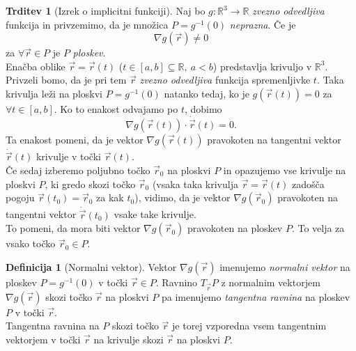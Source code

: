\documentclass[11pt]{article}
\theoremstyle{definition}
\newtheorem{definicija}{Definicija}[section]
\theoremstyle{definition}
\newtheorem{trditev}{Trditev}[section]
\theoremstyle{definition}
\begin{document}
\begin{trditev}[Izrek o implicitni funkciji]

Naj bo $g: \mathbb{R}^3 \rightarrow \mathbb{R}$ \textit{zvezno odvedljiva} funkcija in privzemimo, da je množica $P = g^{-1}(0)$ \textit{neprazna}. Če je
$$\nabla g(\vec{r}) \neq 0$$
za $\forall \vec{r} \in P$ je $P$ \textit{ploskev}. \\

Enačba oblike $\vec{r} = \vec{r}(t)$ ($t \in [a, b] \subseteq \mathbb{R}, ~a < b$) predstavlja krivuljo v $\mathbb{R}^3$. Privzeli bomo, da je pri tem $\vec{r}$ \textit{zvezno odvedljiva} funkcija spremenljivke $t$. Taka krivulja leži na ploskvi $P = g^{-1}(0)$ natanko tedaj, ko je $g(\vec{r}(t)) = 0$ za $\forall t \in [a, b]$. Ko to enakost odvajamo po $t$, dobimo
$$\nabla g(\vec{r}(t)) \cdot \dot{\vec{r}}(t) = 0.$$
Ta enakost pomeni, da je vektor $\nabla g(\vec{r}(t))$ pravokoten na tangentni vektor $\dot{\vec{r}}(t)$ krivulje v točki $\vec{r}(t)$. \\

Če sedaj izberemo poljubno točko $\vec{r}_0$ na ploskvi $P$ in opazujemo vse krivulje na ploskvi $P$, ki gredo skozi točko $\vec{r}_0$ (vsaka taka krivulja $\vec{r} = \vec{r}(t)$ zadošča pogoju $\vec{r}(t_0) = \vec{r}_0$ za kak $t_0$), vidimo, da je vektor $\nabla g(\vec{r}_0)$ pravokoten na tangentni vektor $\dot{\vec{r}}(t_0)$ vsake take krivulje. \\

To pomeni, da mora biti vektor $\nabla g(\vec{r}_0)$ pravokoten na ploskev $P$. To velja za vsako točko $\vec{r}_0 \in P$.
 

\end{trditev}
\vspace{0.5cm}

\begin{definicija}[Normalni vektor]

Vektor $\nabla g(\vec{r})$ imenujemo \textit{normalni vektor} na ploskev $P = g^{-1}(0)$ v točki $\vec{r} \in P$. Ravnino $T_{\vec{r}}P$ z normalnim vektorjem $\nabla g(\vec{r})$ skozi točko $\vec{r}$ na ploskvi $P$ pa imenujemo \textit{tangentna ravnina} na ploskev $P$ v točki $\vec{r}$. \\

Tangentna ravnina na $P$ skozi točko $\vec{r}$ je torej vzporedna vsem tangentnim vektorjem v točki $\vec{r}$ na krivulje skozi $\vec{r}$ na ploskvi $P$.

\end{definicija}
\vspace{0.5cm}
\end{document}
